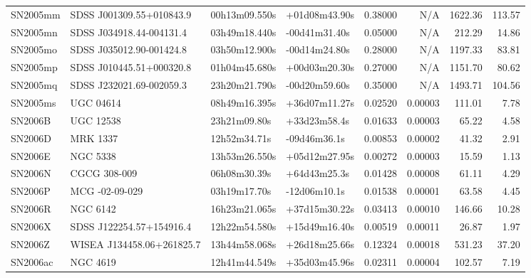 \begin{longtable}{llllrrrr}
SN2005mm         &        SDSS J001309.55+010843.9 &   00h13m09.550s &   +01d08m43.90s &  0.38000 &      N/A &  1622.36 &      113.57 \\
SN2005mn         &        SDSS J034918.44-004131.4 &   03h49m18.440s &   -00d41m31.40s &  0.05000 &      N/A &   212.29 &       14.86 \\
SN2005mo         &        SDSS J035012.90-001424.8 &   03h50m12.900s &   -00d14m24.80s &  0.28000 &      N/A &  1197.33 &       83.81 \\
SN2005mp         &        SDSS J010445.51+000320.8 &   01h04m45.680s &   +00d03m20.30s &  0.27000 &      N/A &  1151.70 &       80.62 \\
SN2005mq         &        SDSS J232021.69-002059.3 &   23h20m21.790s &   -00d20m59.60s &  0.35000 &      N/A &  1493.71 &      104.56 \\
SN2005ms         &                       UGC 04614 &   08h49m16.395s &   +36d07m11.27s &  0.02520 &  0.00003 &   111.01 &        7.78 \\
SN2006B          &                       UGC 12538 &    23h21m09.80s &    +33d23m58.4s &  0.01633 &  0.00003 &    65.22 &        4.58 \\
SN2006D          &                        MRK 1337 &    12h52m34.71s &    -09d46m36.1s &  0.00853 &  0.00002 &    41.32 &        2.91 \\
SN2006E          &                        NGC 5338 &   13h53m26.550s &   +05d12m27.95s &  0.00272 &  0.00003 &    15.59 &        1.13 \\
SN2006N          &                    CGCG 308-009 &    06h08m30.39s &    +64d43m25.3s &  0.01428 &  0.00008 &    61.11 &        4.29 \\
SN2006P          &                  MCG -02-09-029 &    03h19m17.70s &    -12d06m10.1s &  0.01538 &  0.00001 &    63.58 &        4.45 \\
SN2006R          &                        NGC 6142 &   16h23m21.065s &   +37d15m30.22s &  0.03413 &  0.00010 &   146.66 &       10.28 \\
SN2006X          &        SDSS J122254.57+154916.4 &   12h22m54.580s &   +15d49m16.40s &  0.00519 &  0.00011 &    26.87 &        1.97 \\
SN2006Z          &       WISEA J134458.06+261825.7 &   13h44m58.068s &   +26d18m25.66s &  0.12324 &  0.00018 &   531.23 &       37.20 \\
SN2006ac         &                        NGC 4619 &   12h41m44.549s &   +35d03m45.96s &  0.02311 &  0.00004 &   102.57 &        7.19 \\

\end{longtable}
